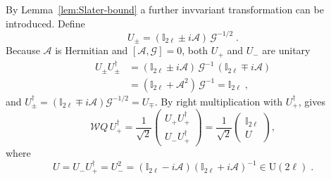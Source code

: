 \documentclass[prx,twocolumn,superscriptaddress,aps,10pt, frontmatterverbose, reprint,footinbib,longbibliography=true]{revtex4-2}
\begin{document}
By Lemma~\ref{lem:Slater-bound} a further invvariant transformation can be introduced.
Define
\begin{equation}
U_{\pm}=(\mathbb{I}_{2\ell}\pm i\mathcal{A})\,\mathcal{G}^{-1/2}\;.
\end{equation}
Because $\mathcal{A}$ is Hermitian and $[\mathcal{A},\mathcal{G}]=0$, both $U_+$ and $U_-$ are unitary\begin{equation}
\begin{split}
U_\pm U_\pm^\dagger&=(\mathbb{I}_{2\ell}\pm i\mathcal{A})\,\mathcal{G}^{-1}\,(\mathbb{I}_{2\ell}\mp i\mathcal{A})\\
    &=(\mathbb{I}_{2\ell}+\mathcal{A}^2)\,\mathcal{G}^{-1}=\mathbb{I}_{2\ell}\;,
\end{split}
\end{equation}
and $U_\pm^\dagger=(\mathbb{I}_{2\ell}\mp i\mathcal{A})\mathcal{G}^{-1/2}=U_\mp$.
By right multiplication with $U_+^\dagger$, gives
\begin{equation}
    \mathcal{W}Q\,U_+^\dagger=\frac{1}{\sqrt2}\begin{pmatrix} U_+U_+^\dagger\\ U_-U_+^\dagger\end{pmatrix}=\frac{1}{\sqrt2}\begin{pmatrix} \mathbb{I}_{2\ell}\\ U\end{pmatrix},
\end{equation}
where
\begin{equation}
U=U_-U_+^\dagger=U_-^2=(\mathbb{I}_{2\ell}-i\mathcal{A})(\mathbb{I}_{2\ell}+i\mathcal{A})^{-1}\in \mathrm{U}(2\ell)\;.
    \label{eq:U-Cayley-A}
\end{equation}
\end{document}
